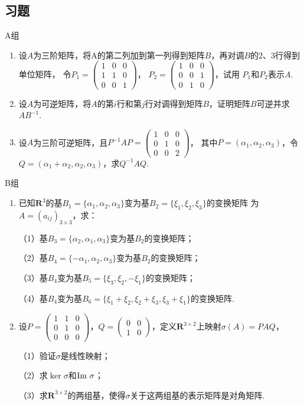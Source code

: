 \subsection{习题}
\centerline{\heiti A组}
\begin{enumerate}
	\item 设$A$为三阶矩阵，将A的第二列加到第一列得到矩阵$B$，再对调$B$的$2$、$3$行得到单位矩阵，
	令$P_1=\begin{pmatrix}1 & 0 & 0 \\ 1 & 1 & 0 \\ 0 & 0 & 1\end{pmatrix}$，
	$P_2=\begin{pmatrix}1 & 0 & 0 \\ 0 & 0 & 1 \\ 0 & 1 & 0\end{pmatrix}$，试用
	$P_1$和$P_2$表示$A$.
	\item 设$A$为可逆矩阵，将$A$的第$i$行和第$j$行对调得到矩阵$B$，证明矩阵$B$可逆并求$AB^{-1}$.
	\item 设$A$为三阶可逆矩阵，且$P^{-1}AP=\begin{pmatrix}1 & 0 & 0 \\ 0 & 1 & 0 \\ 0 & 0 & 2\end{pmatrix}$，
	其中$P=(\alpha_1,\alpha_2,\alpha_3)$，令$Q=(\alpha_1+\alpha_2,\alpha_2,\alpha_3)$，求$Q^{-1}AQ$.
\end{enumerate}
\centerline{\heiti B组}
\begin{enumerate}
	\item 已知$\mathbf{R}^3$的基$B_1=\{\alpha_1,\alpha_2,\alpha_3\}$变为基$B_2=\{\xi_1,\xi_2,\xi_3\}$的变换矩阵
	为$A=(a_{ij})_{3 \times 3}$，求：

	（1）基$B_3=\{\alpha_2,\alpha_1,\alpha_3\}$变为基$B_2$的变换矩阵；

	（2）基$B_4=\{-\alpha_1,\alpha_2,\alpha_3\}$变为基$B_2$的变换矩阵；

	（3）基$B_4$变为基$B_5=\{\xi_3,\xi_2,-\xi_1\}$的变换矩阵；

	（4）基$B_4$变为基$B_6=\{\xi_1+\xi_2,\xi_2+\xi_3,\xi_3+\xi_1\}$的变换矩阵.
	\item 设$P=\begin{pmatrix}
		1 & 1 & 0 \\ 0 & 1 & 0 \\ 0 & 0 & 0
	\end{pmatrix}$，$Q=\begin{pmatrix}
		0 & 0 \\ 1 & 0
	\end{pmatrix}$，定义$\mathbf{R}^{3\times 2}$上映射$\sigma(A)=PAQ$，

	（1）验证$\sigma$是线性映射；

	（2）求$\ker\sigma$和$\textup{Im }\sigma$；

	（3）求$\mathbf{R}^{3\times 2}$的两组基，使得$\sigma$关于这两组基的表示矩阵是对角矩阵.
\end{enumerate}

